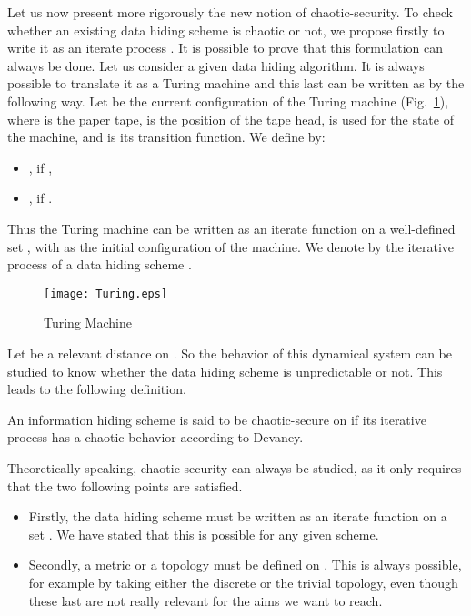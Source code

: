 \documentclass{llncs}
\begin{document}
Let us now present more rigorously the new notion of chaotic-security. To check whether an existing data hiding scheme is chaotic or not, we propose firstly to write it as an iterate process . It is possible to prove that this formulation can always be done. Let us consider a given data hiding algorithm. It is always possible to translate it as a Turing machine and this last can be written as  by the following way. Let  be the current configuration of the Turing machine (Fig.~\ref{Turing}), where  is the paper tape,  is the position of the tape head,  is used for the state of the machine, and  is its transition function. We define  by:
\begin{itemize}
\item , \newline if  ,
\item , \newline if .
\end{itemize}
Thus the Turing machine can be written as an iterate function  on a well-defined set , with  as the initial configuration of the machine. We denote by  the iterative process of a data hiding scheme .

\begin{figure}[h]
  \centering
\texttt{[image: Turing.eps]}
\caption{Turing Machine}
\label{Turing}
\end{figure}



Let  be a relevant distance on . So the behavior of this dynamical system can be studied to know whether the data hiding scheme is unpredictable or not. This leads to the following definition.

\begin{definition}
An information hiding scheme  is said to be chaotic-secure on  if its iterative process  has a chaotic behavior according to Devaney.
\end{definition}

Theoretically speaking, chaotic security can always be studied, as it only requires that the two following points are satisfied.
\begin{itemize}
\item Firstly, the data hiding scheme must be written as an iterate function on a set . We have stated that this is possible for any given scheme.
\item Secondly, a metric or a topology must be defined on . This is always possible, for example by taking either the discrete or the trivial topology, even though these last are not really relevant for the aims we want to reach.
\end{itemize}
\end{document}
